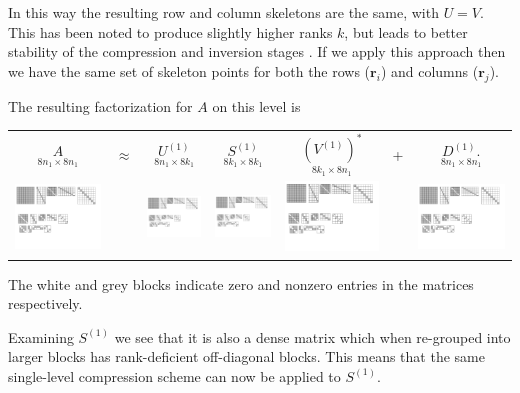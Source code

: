 \documentclass{sfuthesis}
\begin{document}
In this way the resulting row and column skeletons are the same, with $U=V$. This has been noted to produce slightly higher ranks $k$, but leads to better stability of the compression and inversion stages \cite{MartRokh2005, GillYoungMart2012}.
If we apply this approach then we have the same set of skeleton points for both the rows ($\mathbf{r}_i$) and columns ($\mathbf{r}_j$). 

The resulting factorization for $A$ on this level is 
\begin{center}
	\begin{tabular}[t]{ccccccc}
	$\underset{8n_1 \times 8n_1}{A}$ & $\approx$ & $\underset{ \ 8n_1 \times 8k_1 \ }{U^{(1)}}$  &  $\underset{ \ 8k_1 \times 8k_1 \ }{S^{(1)}}$ & $\underset{ \ 8k_1 \times 8n_1 \ }{{(V^{(1)})}^*} $& + &$\underset{ \ 8n_1 \times 8n_1 \ }{D^{(1)}.}$ \\ [.4cm]
	\includegraphics[width=3cm]{BFRecLev1A_8by8} & & \includegraphics[width=1.58cm]{BFRecLev1U1} & \includegraphics[width=1.68cm]{BFRecLev1S1} &\includegraphics[width=3cm]{BFRecLev1V1} &  &  \includegraphics[width=3cm]{BFRecLev1D1} 
	\end{tabular}
\end{center}
The white and grey blocks indicate zero and nonzero entries in the matrices respectively.

Examining $S^{(1)}$ we see that it is also a dense matrix which when re-grouped into larger blocks has rank-deficient off-diagonal blocks. This means that the same single-level compression scheme can now be applied to $S^{(1)}$.
\end{document}
